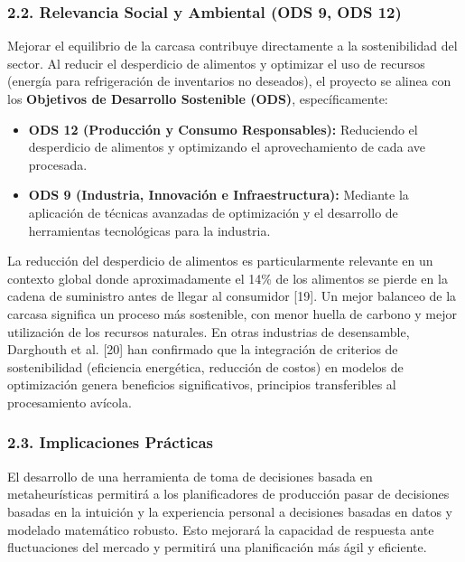 \documentclass[
  spanish,
  12pt,
]{article}
\providecommand{\tightlist}{%
  \setlength{\itemsep}{0pt}\setlength{\parskip}{0pt}}
\begin{document}
\subsubsection{2.2. Relevancia Social y Ambiental (ODS 9, ODS
12)}\label{relevancia-social-y-ambiental-ods-9-ods-12}

Mejorar el equilibrio de la carcasa contribuye directamente a la
sostenibilidad del sector. Al reducir el desperdicio de alimentos y
optimizar el uso de recursos (energía para refrigeración de inventarios
no deseados), el proyecto se alinea con los \textbf{Objetivos de
Desarrollo Sostenible (ODS)}, específicamente:

\begin{itemize}
\tightlist
\item
  \textbf{ODS 12 (Producción y Consumo Responsables):} Reduciendo el
  desperdicio de alimentos y optimizando el aprovechamiento de cada ave
  procesada.
\item
  \textbf{ODS 9 (Industria, Innovación e Infraestructura):} Mediante la
  aplicación de técnicas avanzadas de optimización y el desarrollo de
  herramientas tecnológicas para la industria.
\end{itemize}

La reducción del desperdicio de alimentos es particularmente relevante
en un contexto global donde aproximadamente el 14\% de los alimentos se
pierde en la cadena de suministro antes de llegar al consumidor
{[}19{]}. Un mejor balanceo de la carcasa significa un proceso más
sostenible, con menor huella de carbono y mejor utilización de los
recursos naturales. En otras industrias de desensamble, Darghouth et al.
{[}20{]} han confirmado que la integración de criterios de
sostenibilidad (eficiencia energética, reducción de costos) en modelos
de optimización genera beneficios significativos, principios
transferibles al procesamiento avícola.

\subsubsection{2.3. Implicaciones
Prácticas}\label{implicaciones-pruxe1cticas}

El desarrollo de una herramienta de toma de decisiones basada en
metaheurísticas permitirá a los planificadores de producción pasar de
decisiones basadas en la intuición y la experiencia personal a
decisiones basadas en datos y modelado matemático robusto. Esto mejorará
la capacidad de respuesta ante fluctuaciones del mercado y permitirá una
planificación más ágil y eficiente.
\end{document}
